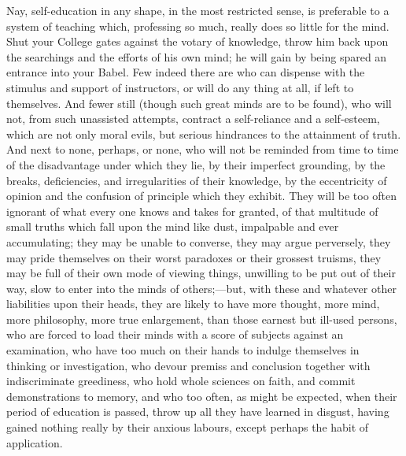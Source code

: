 Nay, self-education in any shape, in the most restricted sense, is
preferable to a system of teaching which, professing so much, really
does so little for the mind. Shut your College gates against the
votary of knowledge, throw him back upon the searchings and the
efforts of his own mind; he will gain by being spared an entrance into
your Babel. Few indeed there are who can dispense with the stimulus
and support of instructors, or will do any thing at all, if left to
themselves. And fewer still (though such great minds are to be found),
who will not, from such unassisted attempts, contract a self-reliance
and a self-esteem, which are not only moral evils, but serious
hindrances to the attainment of truth. And next to none, perhaps, or
none, who will not be reminded from time to time of the disadvantage
under which they lie, by their imperfect grounding, by the breaks,
deficiencies, and irregularities of their knowledge, by the
eccentricity of opinion and the confusion of principle which they
exhibit. They will be too often ignorant of what every one knows and
takes for granted, of that multitude of small truths which fall upon
the mind like dust, impalpable and ever accumulating; they may
be unable to converse, they may argue perversely, they may pride
themselves on their worst paradoxes or their grossest truisms, they
may be full of their own mode of viewing things, unwilling to be put
out of their way, slow to enter into the minds of others;—but, with
these and whatever other liabilities upon their heads, they are likely
to have more thought, more mind, more philosophy, more true
enlargement, than those earnest but ill-used persons, who are forced
to load their minds with a score of subjects against an examination,
who have too much on their hands to indulge themselves in thinking or
investigation, who devour premiss and conclusion together with
indiscriminate greediness, who hold whole sciences on faith, and
commit demonstrations to memory, and who too often, as might be
expected, when their period of education is passed, throw up all they
have learned in disgust, having gained nothing really by their anxious
labours, except perhaps the habit of application.

